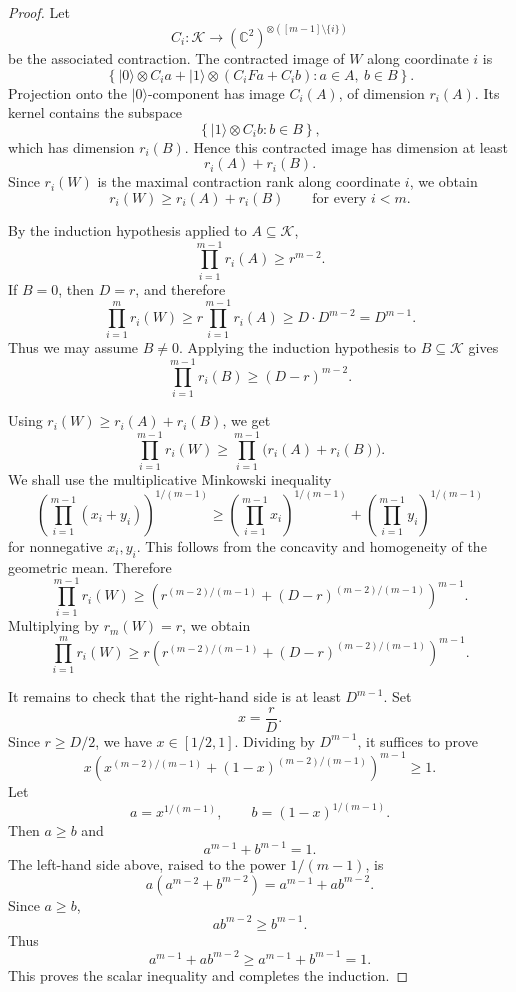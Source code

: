 \documentclass[10pt,a4paper]{amsart}
\begin{document}
\begin{proof}
	Let
	\[
	C_i:\mathcal K\to(\mathbb C^2)^{\otimes([m-1]\setminus\{i\})}
	\]
	be the associated contraction.  The contracted image of \(W\) along coordinate
	\(i\) is
	\[
	\left\{
	|0\rangle\otimes C_i a
	+
	|1\rangle\otimes(C_iFa+C_i b)
	:
	a\in A,\ b\in B
	\right\}.
	\]
	Projection onto the \(|0\rangle\)-component has image \(C_i(A)\), of dimension
	\(r_i(A)\).  Its kernel contains the subspace
	\[
	\left\{
	|1\rangle\otimes C_i b:b\in B
	\right\},
	\]
	which has dimension \(r_i(B)\).  Hence this contracted image has dimension at
	least
	\[
	r_i(A)+r_i(B).
	\]
	Since \(r_i(W)\) is the maximal contraction rank along coordinate \(i\), we
	obtain
	\[
	r_i(W)\geq r_i(A)+r_i(B)
	\qquad\text{for every } i<m.
	\]
	
	By the induction hypothesis applied to \(A\subseteq\mathcal K\),
	\[
	\prod_{i=1}^{m-1} r_i(A)\geq r^{m-2}.
	\]
	If \(B=0\), then \(D=r\), and therefore
	\[
	\prod_{i=1}^m r_i(W)
	\geq
	r\prod_{i=1}^{m-1}r_i(A)
	\geq
	D\cdot D^{m-2}
	=
	D^{m-1}.
	\]
	Thus we may assume \(B\neq0\).  Applying the induction hypothesis to
	\(B\subseteq\mathcal K\) gives
	\[
	\prod_{i=1}^{m-1} r_i(B)\geq (D-r)^{m-2}.
	\]
	
	Using \(r_i(W)\geq r_i(A)+r_i(B)\), we get
	\[
	\prod_{i=1}^{m-1} r_i(W)
	\geq
	\prod_{i=1}^{m-1}\bigl(r_i(A)+r_i(B)\bigr).
	\]
	We shall use the multiplicative Minkowski inequality
	\[
	\left(
	\prod_{i=1}^{m-1}(x_i+y_i)
	\right)^{1/(m-1)}
	\geq
	\left(
	\prod_{i=1}^{m-1}x_i
	\right)^{1/(m-1)}
	+
	\left(
	\prod_{i=1}^{m-1}y_i
	\right)^{1/(m-1)}
	\]
	for nonnegative \(x_i,y_i\).  This follows from the concavity and homogeneity
	of the geometric mean.  Therefore
	\[
	\prod_{i=1}^{m-1} r_i(W)
	\geq
	\left(
	r^{(m-2)/(m-1)}
	+
	(D-r)^{(m-2)/(m-1)}
	\right)^{m-1}.
	\]
	Multiplying by \(r_m(W)=r\), we obtain
	\[
	\prod_{i=1}^m r_i(W)
	\geq
	r
	\left(
	r^{(m-2)/(m-1)}
	+
	(D-r)^{(m-2)/(m-1)}
	\right)^{m-1}.
	\]
	
	It remains to check that the right-hand side is at least \(D^{m-1}\).  Set
	\[
	x=\frac rD.
	\]
	Since \(r\geq D/2\), we have \(x\in[1/2,1]\).  Dividing by \(D^{m-1}\), it
	suffices to prove
	\[
	x
	\left(
	x^{(m-2)/(m-1)}
	+
	(1-x)^{(m-2)/(m-1)}
	\right)^{m-1}
	\geq 1.
	\]
	Let
	\[
	a=x^{1/(m-1)},
	\qquad
	b=(1-x)^{1/(m-1)}.
	\]
	Then \(a\geq b\) and
	\[
	a^{m-1}+b^{m-1}=1.
	\]
	The left-hand side above, raised to the power \(1/(m-1)\), is
	\[
	a(a^{m-2}+b^{m-2})
	=
	a^{m-1}+ab^{m-2}.
	\]
	Since \(a\geq b\),
	\[
	ab^{m-2}\geq b^{m-1}.
	\]
	Thus
	\[
	a^{m-1}+ab^{m-2}
	\geq
	a^{m-1}+b^{m-1}
	=
	1.
	\]
	This proves the scalar inequality and completes the induction.
\end{proof}
\end{document}
